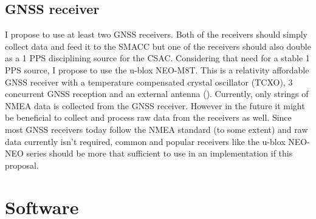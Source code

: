 \documentclass[12pt,english,a4paper]{report}
\begin{document}
\section{GNSS receiver}
I propose to use at least two GNSS receivers. Both of the receivers should simply collect data and feed it to the SMACC but one of the receivers should also double as a 1 PPS disciplining source for the CSAC. Considering that need for a stable 1 PPS source, I propose to use the u-blox NEO-M8T. This is a relativity affordable GNSS receiver with a temperature compensated crystal oscillator (TCXO), 3 concurrent GNSS reception and an external antenna (\cite{UBLOXM8T}). Currently, only strings of NMEA data is collected from the GNSS receiver. However in the future it might be beneficial to collect and process raw data from the receivers as well. Since most GNSS receivers today follow the NMEA standard (to some extent) and raw data currently isn't required, common and popular receivers like the u-blox NEO-NEO series should be more that sufficient to use in an implementation if this proposal.

\chapter{Software}
\end{document}
